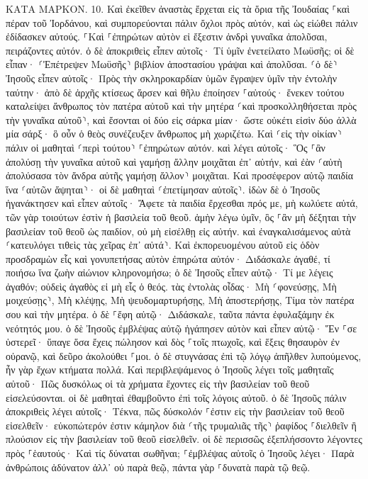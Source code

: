 \documentclass[twoside, 9pt]{extreport}
\begin{document}
ΚΑΤΑ ΜΑΡΚΟΝ.
10.
Καὶ ἐκεῖθεν ἀναστὰς ἔρχεται εἰς τὰ ὅρια τῆς Ἰουδαίας ⸀καὶ πέραν τοῦ Ἰορδάνου, καὶ συμπορεύονται πάλιν ὄχλοι πρὸς αὐτόν, καὶ ὡς εἰώθει πάλιν ἐδίδασκεν αὐτούς. 
⸀Καὶ ⸀ἐπηρώτων αὐτὸν εἰ ἔξεστιν ἀνδρὶ γυναῖκα ἀπολῦσαι, πειράζοντες αὐτόν. 
ὁ δὲ ἀποκριθεὶς εἶπεν αὐτοῖς· Τί ὑμῖν ἐνετείλατο Μωϋσῆς; 
οἱ δὲ εἶπαν· ⸂Ἐπέτρεψεν Μωϋσῆς⸃ βιβλίον ἀποστασίου γράψαι καὶ ἀπολῦσαι. 
⸂ὁ δὲ⸃ Ἰησοῦς εἶπεν αὐτοῖς· Πρὸς τὴν σκληροκαρδίαν ὑμῶν ἔγραψεν ὑμῖν τὴν ἐντολὴν ταύτην· 
ἀπὸ δὲ ἀρχῆς κτίσεως ἄρσεν καὶ θῆλυ ἐποίησεν ⸀αὐτούς· 
ἕνεκεν τούτου καταλείψει ἄνθρωπος τὸν πατέρα αὐτοῦ καὶ τὴν μητέρα ⸂καὶ προσκολληθήσεται πρὸς τὴν γυναῖκα αὐτοῦ⸃, 
καὶ ἔσονται οἱ δύο εἰς σάρκα μίαν· ὥστε οὐκέτι εἰσὶν δύο ἀλλὰ μία σάρξ· 
ὃ οὖν ὁ θεὸς συνέζευξεν ἄνθρωπος μὴ χωριζέτω. 
Καὶ ⸂εἰς τὴν οἰκίαν⸃ πάλιν οἱ μαθηταὶ ⸂περὶ τούτου⸃ ⸀ἐπηρώτων αὐτόν. 
καὶ λέγει αὐτοῖς· Ὃς ⸀ἂν ἀπολύσῃ τὴν γυναῖκα αὐτοῦ καὶ γαμήσῃ ἄλλην μοιχᾶται ἐπ᾽ αὐτήν, 
καὶ ἐὰν ⸂αὐτὴ ἀπολύσασα τὸν ἄνδρα αὐτῆς γαμήσῃ ἄλλον⸃ μοιχᾶται. 
Καὶ προσέφερον αὐτῷ παιδία ἵνα ⸂αὐτῶν ἅψηται⸃· οἱ δὲ μαθηταὶ ⸂ἐπετίμησαν αὐτοῖς⸃. 
ἰδὼν δὲ ὁ Ἰησοῦς ἠγανάκτησεν καὶ εἶπεν αὐτοῖς· Ἄφετε τὰ παιδία ἔρχεσθαι πρός με, μὴ κωλύετε αὐτά, τῶν γὰρ τοιούτων ἐστὶν ἡ βασιλεία τοῦ θεοῦ. 
ἀμὴν λέγω ὑμῖν, ὃς ⸀ἂν μὴ δέξηται τὴν βασιλείαν τοῦ θεοῦ ὡς παιδίον, οὐ μὴ εἰσέλθῃ εἰς αὐτήν. 
καὶ ἐναγκαλισάμενος αὐτὰ ⸂κατευλόγει τιθεὶς τὰς χεῖρας ἐπ᾽ αὐτά⸃. 
Καὶ ἐκπορευομένου αὐτοῦ εἰς ὁδὸν προσδραμὼν εἷς καὶ γονυπετήσας αὐτὸν ἐπηρώτα αὐτόν· Διδάσκαλε ἀγαθέ, τί ποιήσω ἵνα ζωὴν αἰώνιον κληρονομήσω; 
ὁ δὲ Ἰησοῦς εἶπεν αὐτῷ· Τί με λέγεις ἀγαθόν; οὐδεὶς ἀγαθὸς εἰ μὴ εἷς ὁ θεός. 
τὰς ἐντολὰς οἶδας· Μὴ ⸂φονεύσῃς, Μὴ μοιχεύσῃς⸃, Μὴ κλέψῃς, Μὴ ψευδομαρτυρήσῃς, Μὴ ἀποστερήσῃς, Τίμα τὸν πατέρα σου καὶ τὴν μητέρα. 
ὁ δὲ ⸀ἔφη αὐτῷ· Διδάσκαλε, ταῦτα πάντα ἐφυλαξάμην ἐκ νεότητός μου. 
ὁ δὲ Ἰησοῦς ἐμβλέψας αὐτῷ ἠγάπησεν αὐτὸν καὶ εἶπεν αὐτῷ· Ἕν ⸀σε ὑστερεῖ· ὕπαγε ὅσα ἔχεις πώλησον καὶ δὸς ⸀τοῖς πτωχοῖς, καὶ ἕξεις θησαυρὸν ἐν οὐρανῷ, καὶ δεῦρο ἀκολούθει ⸀μοι. 
ὁ δὲ στυγνάσας ἐπὶ τῷ λόγῳ ἀπῆλθεν λυπούμενος, ἦν γὰρ ἔχων κτήματα πολλά. 
Καὶ περιβλεψάμενος ὁ Ἰησοῦς λέγει τοῖς μαθηταῖς αὐτοῦ· Πῶς δυσκόλως οἱ τὰ χρήματα ἔχοντες εἰς τὴν βασιλείαν τοῦ θεοῦ εἰσελεύσονται. 
οἱ δὲ μαθηταὶ ἐθαμβοῦντο ἐπὶ τοῖς λόγοις αὐτοῦ. ὁ δὲ Ἰησοῦς πάλιν ἀποκριθεὶς λέγει αὐτοῖς· Τέκνα, πῶς δύσκολόν ⸀ἐστιν εἰς τὴν βασιλείαν τοῦ θεοῦ εἰσελθεῖν· 
εὐκοπώτερόν ἐστιν κάμηλον διὰ ⸂τῆς τρυμαλιᾶς τῆς⸃ ῥαφίδος ⸀διελθεῖν ἢ πλούσιον εἰς τὴν βασιλείαν τοῦ θεοῦ εἰσελθεῖν. 
οἱ δὲ περισσῶς ἐξεπλήσσοντο λέγοντες πρὸς ⸀ἑαυτούς· Καὶ τίς δύναται σωθῆναι; 
⸀ἐμβλέψας αὐτοῖς ὁ Ἰησοῦς λέγει· Παρὰ ἀνθρώποις ἀδύνατον ἀλλ᾽ οὐ παρὰ θεῷ, πάντα γὰρ ⸀δυνατὰ παρὰ τῷ θεῷ. 
\end{document}
